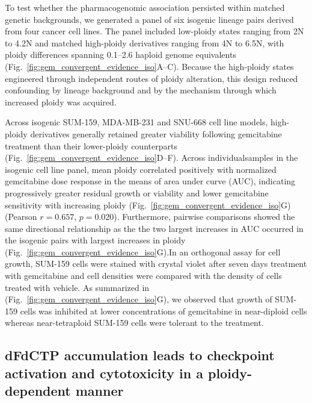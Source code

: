 \documentclass[11pt,notitlepage]{article}
\begin{document}

  To test whether the pharmacogenomic association persisted within matched genetic backgrounds, we generated a panel of six isogenic lineage pairs derived from four cancer cell lines. The panel included low-ploidy states ranging from 2N to 4.2N and matched high-ploidy derivatives ranging from 4N to 6.5N, with ploidy differences spanning 0.1–2.6 haploid genome equivalents (Fig.~\ref{fig:gem_convergent_evidence_iso}A--C). Because the high-ploidy states engineered through independent routes of ploidy alteration, this design reduced confounding by lineage background and by the mechanism through which increased ploidy was acquired.

  Across isogenic SUM-159, MDA-MB-231 and SNU-668 cell line models, high-ploidy derivatives generally retained greater viability following gemcitabine treatment than their lower-ploidy counterparts (Fig.~\ref{fig:gem_convergent_evidence_iso}D--F). Across individualsamples in the isogenic cell line panel, mean ploidy correlated positively with normalized gemcitabine dose response in the means of area under curve (AUC), indicating progressively greater residual growth or viability
  and lower gemcitabine sensitivity with increasing ploidy (Fig.~\ref{fig:gem_convergent_evidence_iso}G) (Pearson \(r=0.657\), \(p=0.020\)). Furthermore, pairwise comparisons showed the same directional relationship as the the two largest increases in AUC occurred in the isogenic pairs with largest increases in ploidy (Fig.~\ref{fig:gem_convergent_evidence_iso}G).In an orthogonal assay for cell growth, SUM-159 cells were stained with crystal violet after seven days treatment with gemcitabine and cell densities were compared with the density of cells treated with vehicle. As summarized in (Fig.~\ref{fig:gem_convergent_evidence_iso}G), we observed that growth of SUM-159 cells was inhibited at lower concentrations of gemcitabine in near-diploid cells whereas near-tetraploid SUM-159 cells were tolerant to the treatment.  


 \subsection*{dFdCTP accumulation leads to checkpoint activation and cytotoxicity in a ploidy-dependent manner}
\end{document}
